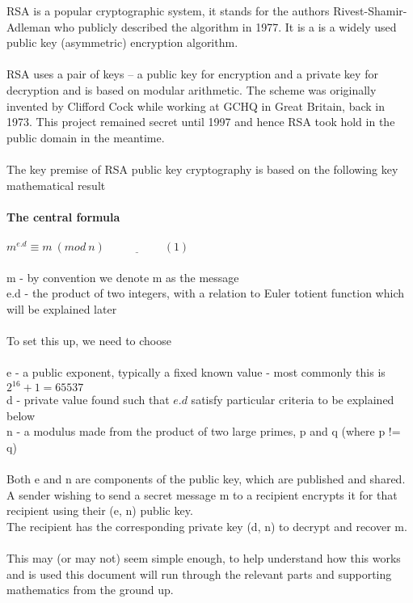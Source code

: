 \documentclass[11pt]{article}   	%
\begin{document}
RSA is a popular cryptographic system, it stands for the authors Rivest-Shamir-Adleman who publicly described the algorithm in 1977.
It is a is a widely used public key (asymmetric) encryption algorithm. \\
\\
RSA uses a pair of keys – a public key for encryption and a private key for decryption and is based on modular arithmetic.
The scheme was originally invented by Clifford Cock while working at GCHQ in Great Britain, back in 1973. This project remained secret until 1997 and hence RSA took hold in the public domain in the meantime. \\
\\
The key premise of RSA public key cryptography is based on the following key mathematical result \\
\\
\textbf{The central formula} \\
\\
$ m^{e.d} \equiv m \ (mod \ n)  \ \ \underline{\hspace{2cm}}(1) $\\
\\
m - by convention we denote m as the message \\
e.d - the product of two integers, with a relation to Euler totient function which will be explained later \\
\\
To set this up, we need to choose \\
\\
e - a public exponent, typically a fixed known value - most commonly this is $ 2^{16} + 1 = 65537 $ \\
d - private value found such that $ e.d $ satisfy particular criteria to be explained below \\
n - a modulus made from the product of two large primes, p and q (where p != q) \\
\\
Both e and n are components of the public key, which are published and shared. \\
A sender wishing to send a secret message m to a recipient encrypts it for that recipient using their (e, n) public key. \\
The recipient has the corresponding private key (d, n) to decrypt and recover m. \\
\\
This may (or may not) seem simple enough, to help understand how this works and is used this document will run through the relevant parts and supporting mathematics from the ground up. \\
\end{document}
